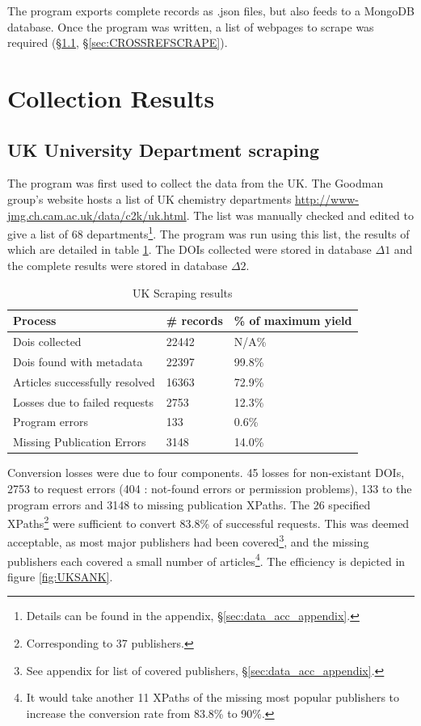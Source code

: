 The program exports complete records as .json files, but also feeds to a MongoDB database. Once the program was written, a list of webpages to scrape was required (\S\ref{sec:UKSCRAPE}, \S\ref{sec:CROSSREFSCRAPE}).
\section{Collection Results}
\subsection{UK University Department scraping}
\label{sec:UKSCRAPE}
The program was first used to collect the data from the UK. The Goodman group's website hosts a list of UK chemistry departments \url{http://www-jmg.ch.cam.ac.uk/data/c2k/uk.html}. The list was manually checked and edited to give a list of 68 departments\footnote{Details can be found in the appendix, \S\ref{sec:data_acc_appendix}.}. The program was run using this list, the results of which are detailed in table \ref{tab:UKSCRAPERES}. The DOIs collected were stored in database $\Delta1$ and the complete results were stored in database $\Delta2$.
\begin{table}[H]
\caption{UK Scraping results}
\label{tab:UKSCRAPERES}
\begin{center}
\begin{tabular}{||l|l|l||}
\hline
Process & \# records & \% of maximum yield\\
\hline
Dois collected & 22442 & N/A\%\\
Dois found with metadata & 22397 & 99.8\%\\
Articles successfully resolved & 16363 & 72.9\%\\
Losses due to failed requests & 2753 & 12.3\%\\
Program errors & 133 & 0.6\%\\
Missing Publication Errors & 3148 & 14.0\% \\
\hline
\end{tabular}
\end{center}
\end{table}
Conversion losses were due to four components. 45 losses for non-existant DOIs, 2753 to request errors (404 : not-found errors or permission problems), 133 to the program errors and 3148 to missing publication XPaths. The 26 specified XPaths\footnote{Corresponding to 37 publishers.} were sufficient to convert 83.8\% of successful requests. This was deemed acceptable, as most major publishers had been covered\footnote{See appendix for list of covered publishers, \S\ref{sec:data_acc_appendix}.}, and the missing publishers each covered a small number of articles\footnote{It would take another 11 XPaths of the missing most popular publishers to increase the conversion rate from 83.8\% to 90\%.}.
The efficiency is depicted in figure \ref{fig:UKSANK}.

